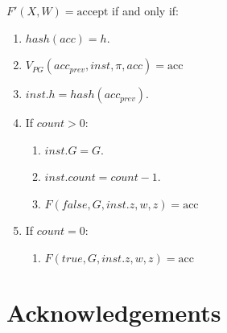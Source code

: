 \documentclass[11pt]{article} %
\begin{document}
$F'(X,W)=\mathrm{accept}$ if and only if:
\begin{enumerate}
 \item  $hash(acc)=h$.
\item $V_{PG}(acc_{prev}, inst, \pi, acc )= \mathrm{acc}$
\item $inst.h=hash(acc_{prev})$.
\item If $count>0$:
\begin{enumerate}
    \item $inst.G = G$.
    \item $inst.count=count-1$.
    \item $F(false,G, inst.z, w,z)=\mathrm{acc}$
    \end{enumerate}
    
\item If $count=0$:
\begin{enumerate}
    \item $F(true,G, inst.z, w,z)=\mathrm{acc}$

    \end{enumerate}
\end{enumerate}




\section*{Acknowledgements}


\end{document}
